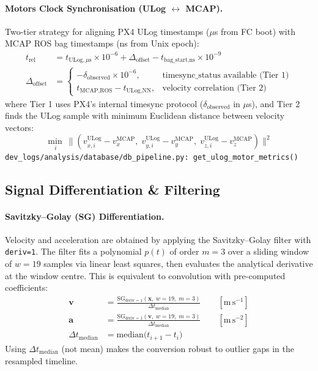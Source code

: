 \medskip
\paragraph{Motors Clock Synchronisation (ULog $\leftrightarrow$ MCAP).}
Two-tier strategy for aligning PX4 ULog timestamps ($\mu$s from FC boot) with MCAP ROS bag timestamps (ns from Unix epoch):
\begin{align}
    t_{\text{rel}} &= t_{\text{ULog},\mu\text{s}} \times 10^{-6} + \Delta_{\text{offset}} - t_{\text{bag\_start,ns}} \times 10^{-9} \\
    \Delta_{\text{offset}} &=
        \begin{cases}
            -\delta_{\text{observed}} \times 10^{-6}, & \text{timesync\_status available (Tier 1)} \\
            t_{\text{MCAP,ROS}} - t_{\text{ULog,NN}},   & \text{velocity correlation (Tier 2)}
        \end{cases} \nonumber
\end{align}
where Tier 1 uses PX4's internal timesync protocol ($\delta_{\text{observed}}$ in $\mu$s), and Tier 2 finds the ULog sample with minimum Euclidean distance between velocity vectors:
\begin{equation}
    \min_{\,i}\ \bigl\|(v_{x,i}^{\text{ULog}} - v_x^{\text{MCAP}},\; v_{y,i}^{\text{ULog}} - v_y^{\text{MCAP}},\; v_{z,i}^{\text{ULog}} - v_z^{\text{MCAP}})\bigr\|^2
\end{equation}
\texttt{\small dev\_logs/analysis/database/db\_pipeline.py:\ get\_ulog\_motor\_metrics()}

\subsection{Signal Differentiation \& Filtering}

\paragraph{Savitzky--Golay (SG) Differentiation.}
Velocity and acceleration are obtained by applying the Savitzky--Golay filter with \texttt{deriv=1}. The filter fits a polynomial $p(t)$ of order $m = 3$ over a sliding window of $w = 19$ samples via linear least squares, then evaluates the analytical derivative at the window centre. This is equivalent to convolution with pre-computed coefficients:
\begin{align}
    \mathbf{v} &= \frac{\mathrm{SG}_{\text{deriv}=1}(\mathbf{x},\; w=19,\; m=3)}{\Delta t_{\text{median}}} \qquad [\mathrm{m\,s^{-1}}] \\
    \mathbf{a} &= \frac{\mathrm{SG}_{\text{deriv}=1}(\mathbf{v},\; w=19,\; m=3)}{\Delta t_{\text{median}}} \qquad [\mathrm{m\,s^{-2}}] \\
    \Delta t_{\text{median}} &= \mathrm{median}\bigl(t_{i+1} - t_i\bigr) \nonumber
\end{align}
Using $\Delta t_{\text{median}}$ (not mean) makes the conversion robust to outlier gaps in the resampled timeline.

